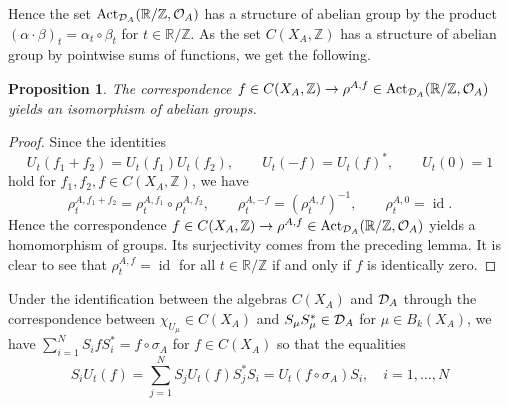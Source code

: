 \documentclass[11pt]{article}
\newtheorem{proposition}[theorem]{Proposition}
\theoremstyle{plain}
\theoremstyle{definition}
\numberwithin{equation}{section}
\newcommand{\id}{\operatorname{id}}
\newcommand{\RZ}{\mathbb{R}/{\mathbb{Z}}}
\newcommand{\Z}{\mathbb{Z}}
\begin{document}
Hence the set ${{\operatorname{Act}_{{{\mathcal{D}}_A}}(\mathbb{R}/{\mathbb{Z}},{{\mathcal{O}}_A})}}$ has a structure of abelian group by the product
$(\alpha\cdot\beta)_t = \alpha_t\circ\beta_t$ for $t \in \RZ$.
As the set $C(X_A,\Z)$ 
has a structure of abelian group by pointwise sums of functions,
we get the following.
\begin{proposition} \label{prop:abelgr}
The correspondence
$
f \in C(X_A,\Z) \rightarrow \rho^{A,f} \in \ActA
$
yields an isomorphism of abelian groups.
\end{proposition}
\begin{proof}
Since the identities
\begin{equation*}
U_t(f_1 + f_2) = U_t(f_1) U_t(f_2),
\qquad
U_t(-f) = U_{t}(f)^*,
\qquad
U_t(0) = 1
\end{equation*}
hold for
$f_1, f_2, f \in C(X_A,\Z)$,
we have
\begin{equation*}
\rho_t^{A,f_1 + f_2} = \rho_t^{A,f_1}\circ \rho_t^{A,f_2},
\qquad
\rho_t^{A,-f} = (\rho_{t}^{A,f})^{-1},
\qquad
\rho_t^{A,0} = \id.
\end{equation*}
Hence the correspondence
$f \in C(X_A,\Z) \rightarrow \rho^{A,f} \in \ActA$
yields a homomorphism of groups.
Its surjectivity comes from the preceding lemma.
It is clear to see that $\rho_t^{A,f} = \id$ for all $t \in \RZ$
if and only if $f$ is identically zero.
\end{proof}
Under the identification
between
the algebras 
$C(X_A)$ and ${{\mathcal{D}}_A}$
through the correspondence 
between
$\chi_{U_\mu} \in C(X_A)$
and
$S_\mu S_\mu^* \in {{\mathcal{D}}_A}$
for $\mu \in B_k(X_A)$,
we have
$ \sum_{i=1}^N S_i f S_i^* = f \circ \sigma_A$
for $f \in C(X_A)$
so that the equalities
\begin{equation}
S_i U_t(f) 
= \sum_{j=1}^N S_j U_t(f) S_j^* S_i 
= U_t(f\circ\sigma_A) S_i, 
\quad i=1,\dots,N \label{eq:siu}
\end{equation}
\end{document}
